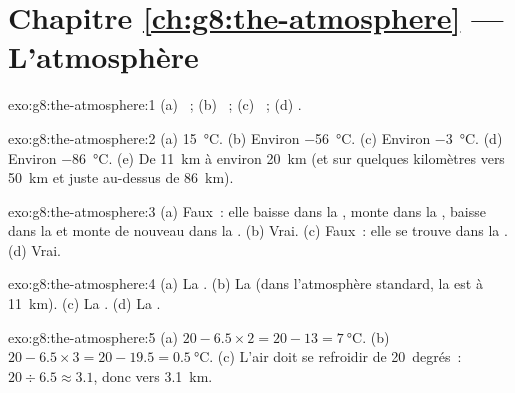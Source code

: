 \section*{Chapitre \ref{ch:g8:the-atmosphere} --- L'atmosphère}

\begin{solution}{exo:g8:the-atmosphere:1}
(a) ~; (b) ~; (c) ~; (d) .
\end{solution}

\begin{solution}{exo:g8:the-atmosphere:2}
(a) \qty{15}{\degreeCelsius}. (b) Environ \qty{-56}{\degreeCelsius}.
(c) Environ \qty{-3}{\degreeCelsius}. (d) Environ \qty{-86}{\degreeCelsius}.
(e) De \qty{11}{km} à environ \qty{20}{km} (et sur quelques kilomètres
vers \qty{50}{km} et juste au-dessus de \qty{86}{km}).
\end{solution}

\begin{solution}{exo:g8:the-atmosphere:3}
(a) Faux~: elle baisse dans la , monte dans la ,
baisse dans la  et monte de nouveau dans la .
(b) Vrai. (c) Faux~: elle se trouve dans la . (d) Vrai.
\end{solution}

\begin{solution}{exo:g8:the-atmosphere:4}
(a) La . (b) La  (dans l'atmosphère standard, la
 est à \qty{11}{km}). (c) La . (d) La .
\end{solution}

\begin{solution}{exo:g8:the-atmosphere:5}
(a) $20 - 6.5 \times 2 = 20 - 13 = \qty{7}{\degreeCelsius}$. (b) $20 -
6.5 \times 3 = 20 - 19.5 = \qty{0.5}{\degreeCelsius}$. (c) L'air doit se
refroidir de 20~degrés~: $20 \div 6.5 \approx 3.1$, donc vers
\qty{3.1}{km}.
\end{solution}

